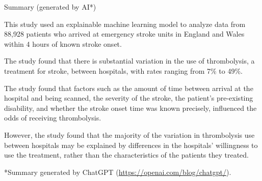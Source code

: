 \documentclass{beamer}
\begin{document}
\begin{frame}{Summary (generated by AI*)}

This study used an explainable machine learning model to analyze data from 88,928 patients who arrived at emergency stroke units in England and Wales within 4 hours of known stroke onset.

\vspace{1mm}

The study found that there is substantial variation in the use of thrombolysis, a treatment for stroke, between hospitals, with rates ranging from 7\% to 49\%.

\vspace{1mm}

The study found that factors such as the amount of time between arrival at the hospital and being scanned, the severity of the stroke, the patient’s pre-existing disability, and whether the stroke onset time was known precisely, influenced the odds of receiving thrombolysis. 

\vspace{1mm}

However, the study found that the majority of the variation in thrombolysis use between hospitals may be explained by differences in the hospitals’ willingness to use the treatment, rather than the characteristics of the patients they treated.

\vspace{2mm}
\footnotesize
*Summary generated by ChatGPT (\url{https://openai.com/blog/chatgpt/}).

\end{frame}
\end{document}
